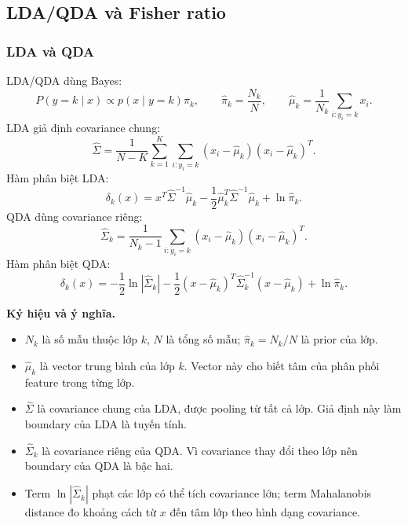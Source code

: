\documentclass[12pt,a4paper]{article}
\begin{document}
\subsection{LDA/QDA và Fisher ratio}

\subsubsection{LDA và QDA}

LDA/QDA dùng Bayes:
\begin{equation}
 P(y=k\mid x)\propto p(x\mid y=k)\pi_k, \qquad \hat{\pi}_k=\frac{N_k}{N}, \qquad \hat{\mu}_k=\frac{1}{N_k}\sum_{i:y_i=k}x_i.
\end{equation}
LDA giả định covariance chung:
\begin{equation}
 \hat{\Sigma}=\frac{1}{N-K}\sum_{k=1}^{K}\sum_{i:y_i=k}(x_i-\hat{\mu}_k)(x_i-\hat{\mu}_k)^T.
\end{equation}
Hàm phân biệt LDA:
\begin{equation}
 \delta_k(x)=x^T\hat{\Sigma}^{-1}\hat{\mu}_k-\frac{1}{2}\hat{\mu}_k^T\hat{\Sigma}^{-1}\hat{\mu}_k+\ln\hat{\pi}_k.
\end{equation}
QDA dùng covariance riêng:
\begin{equation}
 \hat{\Sigma}_k=\frac{1}{N_k-1}\sum_{i:y_i=k}(x_i-\hat{\mu}_k)(x_i-\hat{\mu}_k)^T.
\end{equation}
Hàm phân biệt QDA:
\begin{equation}
 \delta_k(x)=-\frac{1}{2}\ln|\hat{\Sigma}_k|-\frac{1}{2}(x-\hat{\mu}_k)^T\hat{\Sigma}_k^{-1}(x-\hat{\mu}_k)+\ln\hat{\pi}_k.
\end{equation}

\textbf{Ký hiệu và ý nghĩa.}
\begin{itemize}
  \item $N_k$ là số mẫu thuộc lớp $k$, $N$ là tổng số mẫu; $\hat{\pi}_k=N_k/N$ là prior của lớp.
  \item $\hat{\mu}_k$ là vector trung bình của lớp $k$. Vector này cho biết tâm của phân phối feature trong từng lớp.
  \item $\hat{\Sigma}$ là covariance chung của LDA, được pooling từ tất cả lớp. Giả định này làm boundary của LDA là tuyến tính.
  \item $\hat{\Sigma}_k$ là covariance riêng của QDA. Vì covariance thay đổi theo lớp nên boundary của QDA là bậc hai.
  \item Term $\ln|\hat{\Sigma}_k|$ phạt các lớp có thể tích covariance lớn; term Mahalanobis distance đo khoảng cách từ $x$ đến tâm lớp theo hình dạng covariance.
\end{itemize}
\end{document}
